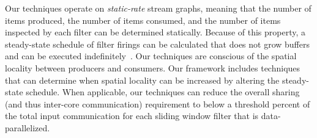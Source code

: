 Our techniques operate on {\it static-rate} stream graphs, meaning
that the number of items produced, the number of items consumed, and
the number of items inspected by each filter can be determined
statically.  Because of this property, a steady-state schedule of
filter firings can be calculated that does not grow buffers and can be
executed indefinitely~\cite{lee87}.  Our techniques are conscious of
the spatial locality between producers and consumers.  Our framework
includes techniques that can determine when spatial locality can be
increased by altering the steady-state schedule.  When applicable, our
techniques can reduce the overall sharing (and thus inter-core
communication) requirement to below a threshold percent of the total
input communication for each sliding window filter that is
data-parallelized. 

\begin{figure}[t]
\centering
{}

\end{figure}
